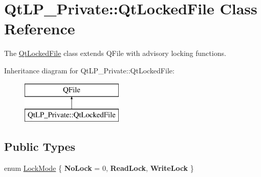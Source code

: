 \hypertarget{class_qt_l_p___private_1_1_qt_locked_file}{}\section{Qt\+L\+P\+\_\+\+Private\+:\+:Qt\+Locked\+File Class Reference}
\label{class_qt_l_p___private_1_1_qt_locked_file}


The \hyperlink{class_qt_l_p___private_1_1_qt_locked_file}{Qt\+Locked\+File} class extends Q\+File with advisory locking functions.  


Inheritance diagram for Qt\+L\+P\+\_\+\+Private\+:\+:Qt\+Locked\+File\+:\begin{figure}[H]
\begin{center}
\leavevmode
\includegraphics[height=2.000000cm]{class_qt_l_p___private_1_1_qt_locked_file}
\end{center}
\end{figure}
\subsection*{Public Types}
\begin{DoxyCompactItemize}
\item 
enum \hyperlink{class_qt_l_p___private_1_1_qt_locked_file_ab9a54228983e33cf1fb8dace52141f26}{Lock\+Mode} \{ {\bfseries No\+Lock} = 0, 
{\bfseries Read\+Lock}, 
{\bfseries Write\+Lock}
 \}
\end{DoxyCompactItemize}

